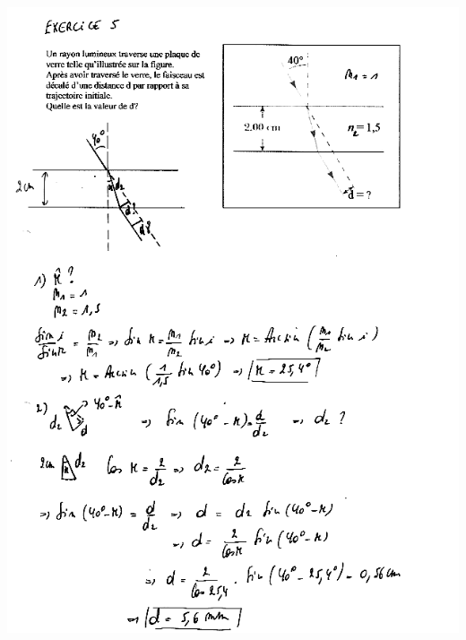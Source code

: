 \includegraphics[width=17.503cm,height=24.231cm]{Pictures/100000010000026F0000035E2F0BA8745765B6B1.png}
